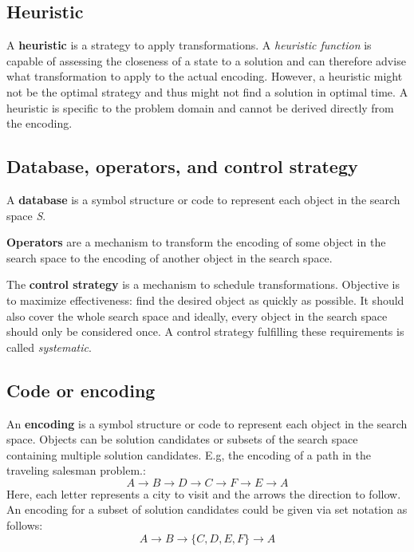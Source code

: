 \documentclass[11pt]{article}
\begin{document}
\subsection{Heuristic}
A \textbf{heuristic} is a strategy to apply transformations. A \emph{heuristic function} is capable of assessing the closeness of a state to a solution and can therefore advise what transformation to apply to the actual encoding. However, a heuristic might not be the optimal strategy and thus might not find a solution in optimal time. A heuristic is specific to the problem domain and cannot be derived directly from the encoding.

\subsection{Database, operators, and control strategy}
A \textbf{database} is a symbol structure or code to represent each object in the search space \emph{S}.

\textbf{Operators} are a mechanism to transform the encoding of some object in the search space to the encoding of another object in the search space.

The \textbf{control strategy} is a mechanism to schedule transformations. Objective is to maximize effectiveness: find the desired object as quickly as possible. It should also cover the whole search space and ideally, every object in the search space should only be considered once. A control strategy fulfilling these requirements is called \emph{systematic}. 

\subsection{Code or encoding}
An \textbf{encoding} is a symbol structure or code to represent each object in the search space. Objects can be solution candidates or subsets of the search space containing multiple solution candidates. E.g, the encoding of a path in the traveling salesman problem.:
\begin{equation*}
A \rightarrow B \rightarrow D \rightarrow C \rightarrow F \rightarrow E \rightarrow A
\end{equation*}
Here, each letter represents a city to visit and the arrows the direction to follow. An encoding for a subset of solution candidates could be given via set notation as follows:
\begin{equation*}
A \rightarrow B \rightarrow \{C,D,E,F\} \rightarrow A
\end{equation*}
\end{document}
